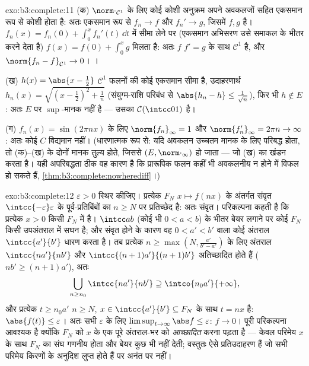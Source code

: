 \begin{solution}{exo:b3:complete:11}
(क) $\norm\cdot_{\mathcal C^1}$ के लिए कोई कोशी अनुक्रम अपने अवकलजों सहित एकसमान रूप से
कोशी होता है: अतः एकसमान रूप से $f_n \to f$ और $f_n' \to g$, जिसमें $f, g$ 
है। $f_n(x) = f_n(0) + \int_0^xf_n'(t)\,\dd t$ में सीमा लेने पर (एकसमान अभिसरण उसे समाकल के भीतर करने
देता है) $f(x) = f(0) + \int_0^xg$ मिलता है: अतः $f$ $f' = g$ के साथ $\mathcal C^1$ है, और $\norm{f_n - f}_{\mathcal C^1} \to 0$।
।

(ख) $h(x) = \abs{x - \frac12}$ $\mathcal C^1$ फलनों की कोई एकसमान सीमा है, उदाहरणार्थ $h_n(x) = \sqrt{(x -
\frac12)^2 + \frac1n}$ (संयुग्म-राशि
परिबंध से $\abs{h_n - h} \leq \frac1{\sqrt n}$), फिर भी $h \notin E$: अतः $E$ पर $\sup$-मानक  नहीं
है --- उसका  $\mathcal C(\intcc01)$ है।

(ग) $f_n(x) = \sin(2\pi nx)$ के लिए $\norm{f_n}_\infty = 1$ और $\norm{f_n'}_\infty = 2\pi n \to \infty$: अतः कोई $C$ विद्यमान नहीं।
(धारणात्मक रूप से: यदि अवकलन उच्चतम मानक के लिए परिबद्ध होता, तो
(क)--(ख) के दोनों मानक तुल्य होते, जिससे $(E, \norm\cdot_\infty)$  हो जाता ---
जो (ख) का खंडन करता है। यही अपरिबद्धता ठीक वह कारण है कि प्रारूपिक
 फलन कहीं भी अवकलनीय न होने में विफल हो सकते हैं, \cref{thm:b3:complete:nowherediff}।)
\end{solution}

\begin{solution}{exo:b3:complete:12}
$\varepsilon > 0$ स्थिर कीजिए। प्रत्येक $F_N$  $x \mapsto f(nx)$ के अंतर्गत संवृत $\intcc{-\varepsilon}
\varepsilon$
के पूर्व-प्रतिबिंबों का $n
\geq N$ पर प्रतिच्छेद है: अतः संवृत। परिकल्पना
कहती है कि प्रत्येक $x > 0$ किसी $F_N$ में है।  $\intcc ab$ (कोई भी
$0 < a <
b$) के भीतर बेयर लगाने पर कोई $F_N$ किसी उपअंतराल में सघन है;
और संवृत होने के कारण वह $0 < a' < b'$ वाला कोई अंतराल $\intcc{a'}{b'}$ धारण करता है।
तब प्रत्येक $n \geq \max(N, \frac{a'}{b' - a'})$ के लिए अंतराल $\intcc{na'}{nb'}$ और $\intcc{(n+1)a'}{(n+1)b'}$ अतिच्छादित होते हैं
($nb' \geq (n+1)a'$), अतः
\[
\bigcup_{n \geq n_0}\intcc{na'}{nb'} \supseteq
\intco{n_0a'}{+\infty},
\]
और प्रत्येक $t \geq n_0a'$ $n \geq N$, $x \in
\intcc{a'}{b'} \subseteq F_N$ के साथ $t = nx$ है: $\abs{f(t)} \leq \varepsilon$। अतः सभी
$\varepsilon$ के लिए $\limsup_{t\to\infty}\abs f \leq \varepsilon$: $f \to 0$। पूरी परिकल्पना आवश्यक है क्योंकि $F_N$
को $x$ के एक पूरे अंतराल-भर को \emph{आच्छादित} करना पड़ता है ---
केवल परिमेय $x$ के साथ $F_N$ का संघ गणनीय होता और बेयर कुछ भी नहीं
देती; वस्तुतः ऐसे  प्रतिउदाहरण हैं जो सभी परिमेय किरणों के अनुदिश
लुप्त होते हैं पर अनंत पर नहीं।
\end{solution}

